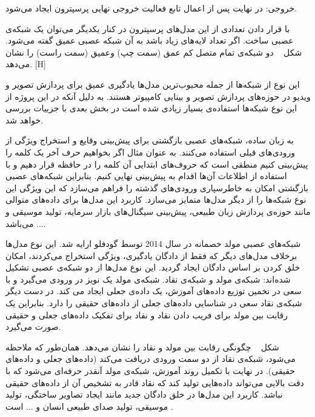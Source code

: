  خروجی: در نهایت پس از اعمال تابع فعالیت خروجی نهایی پرسپترون ایجاد می‌شود.

با قرار دادن تعدادی از این مدل‌های پرسپترون در کنار یکدیگر می‌توان یک شبکه‌ی عصبی ساخت. اگر تعداد لایه‌های زیاد باشد به آن شبکه عصبی عمیق گفته می‌شود. شکل ~ دو شبکه‌ی تمام متصل کم عمق (سمت چپ) وعمیق (سمت راست) را نشان می‌دهد. 
[H]

این نوع از شبکه‌ها از جمله محبوب‌ترین مدل‌ها یادگیری عمیق برای پردازش تصویر و ویدیو در حوزه‌های پردازش تصویر و بینایی کامپیوتر هستند. به دلیل آنکه در این پروژه از این نوع شبکه‌ها استفاده‌ی بسیار زیادی شده است در بخش بعدی با جزییات بررسی خواهد شد.

به زبان ساده، شبکه‌های عصبی بازگشتی برای پیش‌بینی وقایع و استخراج ویژگی از ورودی‌های قبلی استفاده می‌کنند. به عنوان مثال اگر بخواهیم حرف آخر یک کلمه را پیش‌بینی کنیم منطقی است که حروف‌های ابتدایی آن کلمه را در حافظه قرار دهیم و با استفاده از اطلاعات آن‌ها اقدام به پیش‌بینی نهایی کنیم. بنابراین شبکه‌های عصبی بازگشتی امکان به ‌خاطرسپاری ورودی‌های گذشته را فراهم می‌سازد که این ویژگی این نوع شبکه‌ها را از دیگر مدل‌ها متمایز می‌سازد. کاربرد این مدل‌ها برای داده‌های متوالی مانند حوزه‌ی پردازش زبان طبیعی، پیش‌بینی سیگنال‌های بازار سرمایه، تولید موسیقی و ... می‌باشد.

شبکه‌های عصبی مولد خصمانه در سال 2014 توسط گودفلو  ارایه شد. این نوع مدل‌ها برخلاف مدل‌های دیگر که فقط از دادگان یادگیری، ویژگی استخراج می‌کردند، امکان خلق کردن بر اساس دادگان ایجاد گردید. این نوع مدل‌ها از دو شبکه‌ی عصبی تشکیل شده‌اند: شبکه‌ی مولد و شبکه‌ی نقاد. شبکه‌ی مولد یک نویز در ورودی می‌گیرد و با سعی در تخمین توزیع داده‌های آموزش، یک داده‌ی جعلی ایجاد می کند. در دست دیگر شبکه‌ی نقاد سعی در شناسایی داده‌های جعلی از داده‌های حقیقی را دارد. بنابراین یک رقابت بین مولد برای فریب دادن نقاد و نقاد برای تفکیک داده‌های جعلی و حقیقی صورت می‌گیرد. 

شکل ~ چگونگی رقابت بین مولد و نقاد را نشان می‌دهد. همان‌طور که ملاحظه می‌شود، شبکه‌ی نقاد از دو سمت ورودی دریافت می‌کند (داده‌های جعلی و داده‌های حقیقی). در نهایت با تکمیل روند آموزش، شبکه‌ی مولد آنقدر حرفه‌ای می‌شود که با دقت بالایی می‌تواند داده‌هایی تولید کند که نقاد قادر به تشخیص آن از داده‌های حقیقی نباشد. کاربرد این مدل‌ها در خلق دادگان جدید مانند ایجاد تصاویر ساختگی، تولید موسیقی، تولید صدای طبیعی انسان و ... است .

